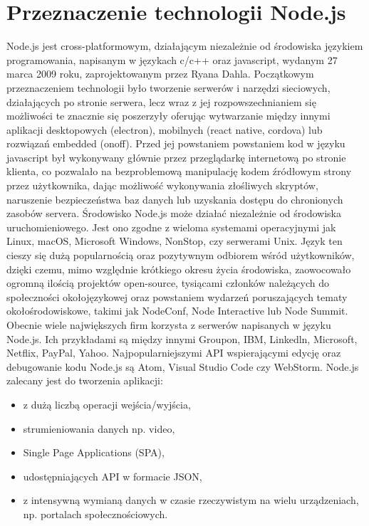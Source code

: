 \documentclass[12pt]{report}
\begin{document}
  \section{Przeznaczenie technologii Node.js}
  Node.js jest cross-platformowym, działającym niezależnie od środowiska językiem programowania, napisanym w językach c/c++ oraz javascript, wydanym 27 marca 2009 roku, zaprojektowanym przez Ryana Dahla.
  Początkowym przeznaczeniem technologii było tworzenie serwerów i narzędzi sieciowych, działających po stronie serwera, lecz wraz z jej rozpowszechnianiem się możliwości te znacznie się poszerzyły oferując wytwarzanie między innymi aplikacji desktopowych (electron), mobilnych (react native, cordova) lub rozwiązań embedded (onoff).
  Przed jej powstaniem powstaniem kod w języku javascript był wykonywany głównie przez przeglądarkę internetową po stronie klienta, co pozwalało na bezproblemową manipulację kodem źródłowym strony przez użytkownika, dając możliwość wykonywania złośliwych skryptów, naruszenie bezpieczeństwa baz danych lub uzyskania dostępu do chronionych zasobów servera.
  Środowisko Node.js może działać niezależnie od środowiska uruchomieniowego.
  Jest ono zgodne z wieloma systemami operacyjnymi jak  Linux, macOS, Microsoft Windows, NonStop, czy serwerami Unix.
  Język ten cieszy się dużą popularnością oraz pozytywnym odbiorem wśród użytkowników, dzięki czemu, mimo względnie krótkiego okresu życia środowiska, zaowocowało ogromną ilością projektów open-source, tysiącami członków należących do społeczności okołojęzykowej oraz powstaniem wydarzeń poruszających tematy okołośrodowiskowe, takimi jak NodeConf, Node Interactive lub Node Summit.
  Obecnie wiele największych firm korzysta z serwerów napisanych w języku Node.js.
  Ich przykładami są między innymi Groupon, IBM, Linkedln, Microsoft, Netflix, PayPal, Yahoo.
  Najpopularniejszymi API wspierającymi edycję oraz debugowanie kodu Node.js są Atom, Visual Studio Code czy WebStorm.
  \newline Node.js zalecany jest do tworzenia aplikacji: 

  \begin{itemize}
    \item z dużą liczbą operacji wejścia/wyjścia,
    \item strumieniowania danych np. video, 
    \item Single Page Applications (SPA),
    \item udostępniających API w formacie JSON,
    \item z intensywną wymianą danych w czasie rzeczywistym na wielu urządzeniach, np. portalach społecznościowych.
  \end{itemize} 
\end{document}
